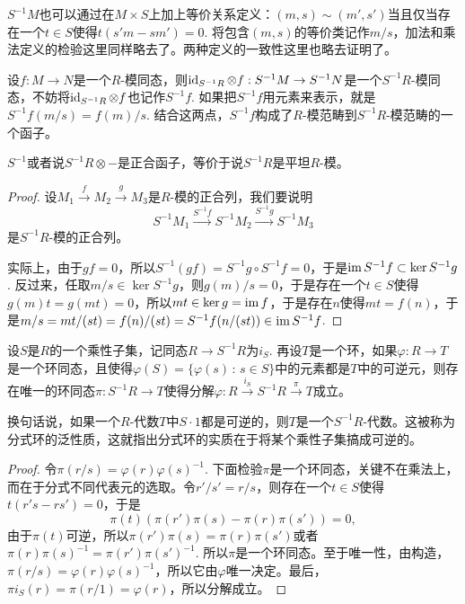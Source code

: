 $S^{-1}M$也可以通过在$M\times S$上加上等价关系定义：$(m,s)\sim (m',s')$当且仅当存在一个$t\in S$使得$t(s'm-sm')=0$. 将包含$(m,s)$的等价类记作$m/s$，加法和乘法定义的检验这里同样略去了。两种定义的一致性这里也略去证明了。

\para 设$f:M\to N$是一个$R$-模同态，则$\operatorname{id}_{S^{-1}R}\otimes f:S^{-1}M\to S^{-1}N$是一个$S^{-1}R$-模同态，不妨将$\operatorname{id}_{S^{-1}R}\otimes f$也记作$S^{-1}f$. 如果把$S^{-1}f$用元素来表示，就是$S^{-1}f(m/s)=f(m)/s$. 结合这两点，$S^{-1}f$构成了$R$-模范畴到$S^{-1}R$-模范畴的一个函子。

\begin{pro}
$S^{-1}$或者说$S^{-1}R\otimes -$是正合函子，等价于说$S^{-1}R$是平坦$R$-模。
\end{pro}

\begin{proof}
设$M_1\xrightarrow{f} M_2\xrightarrow{g} M_3$是$R$-模的正合列，我们要说明
\[
	S^{-1}M_1\xrightarrow{S^{-1}f} S^{-1}M_2\xrightarrow{S^{-1}g} S^{-1}M_3
\]
是$S^{-1}R$-模的正合列。

实际上，由于$gf=0$，所以$S^{-1}(gf)=S^{-1}g\circ S^{-1}f=0$，于是$\operatorname{im} S^{-1}f\subset \ker S^{-1}g$. 反过来，任取$m/s\in \ker S^{-1}g$，则$g(m)/s=0$，于是存在一个$t\in S$使得$g(m)t=g(mt)=0$，所以$mt\in \ker g=\operatorname{im} f$，于是存在$n$使得$mt=f(n)$，于是$m/s=mt/(st)=f(n)/(st)=S^{-1}f(n/(st))\in \operatorname{im} S^{-1}f$.
\end{proof}

\begin{pro}
设$S$是$R$的一个乘性子集，记同态$R\to S^{-1}R$为$i_S$. 再设$T$是一个环，如果$\varphi:R\to T$是一个环同态，且使得$\varphi(S)=\{\varphi(s)\,:\, s\in S\}$中的元素都是$T$中的可逆元，则存在唯一的环同态$\pi:S^{-1}R\to T$使得分解$\varphi:R\xrightarrow{i_S}S^{-1}R\xrightarrow{\pi} T$成立。
\end{pro}

换句话说，如果一个$R$-代数$T$中$S\cdot 1$都是可逆的，则$T$是一个$S^{-1}R$-代数。这被称为分式环的泛性质，这就指出分式环的实质在于将某个乘性子集搞成可逆的。

\begin{proof}
	令$\pi(r/s)=\varphi(r)\varphi(s)^{-1}$. 下面检验$\pi$是一个环同态，关键不在乘法上，而在于分式不同代表元的选取。令$r'/s'=r/s$，则存在一个$t\in S$使得$t(r's-rs')=0$，于是
	\[
		\pi(t)(\pi(r')\pi(s)-\pi(r)\pi(s'))=0,
	\]
	由于$\pi(t)$可逆，所以$\pi(r')\pi(s)=\pi(r)\pi(s')$或者$\pi(r)\pi(s)^{-1}=\pi(r')\pi(s')^{-1}$. 所以$\pi$是一个环同态。至于唯一性，由构造，$\pi(r/s)=\varphi(r)\varphi(s)^{-1}$，所以它由$\varphi$唯一决定。最后，$\pi i_S(r)=\pi(r/1)=\varphi(r)$，所以分解成立。
\end{proof}

